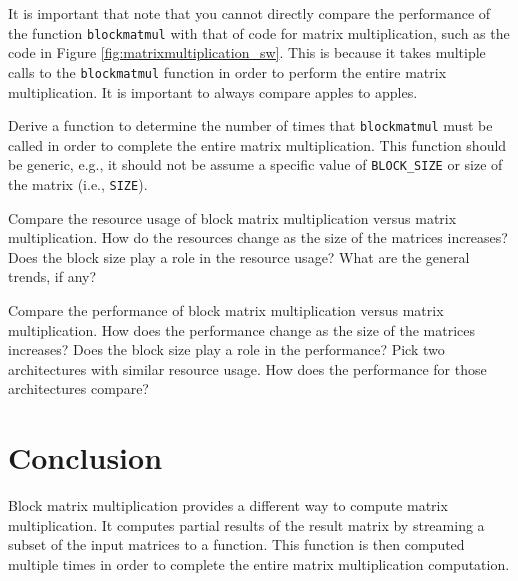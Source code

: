\begin{aside}
It is important that note that you cannot directly compare the performance of the function \lstinline{blockmatmul} with that of code for matrix multiplication, such as the code in Figure \ref{fig:matrixmultiplication_sw}. This is because it takes multiple calls to the \lstinline{blockmatmul} function in order to perform the entire matrix multiplication. It is important to always compare apples to apples.

\begin{exercise}
Derive a function to determine the number of times that \lstinline{blockmatmul} must be called in order to complete the entire matrix multiplication. This function should be generic, e.g., it should not be assume a specific value of \lstinline{BLOCK_SIZE} or size of the matrix (i.e., \lstinline{SIZE}).
\end{exercise}

\begin{exercise}
Compare the resource usage of block matrix multiplication versus matrix multiplication. How do the resources change as the size of the matrices increases? Does the block size play a role in the resource usage? What are the general trends, if any?
\end{exercise}

\begin{exercise}
Compare the performance of block matrix multiplication versus matrix multiplication. How does the performance change as the size of the matrices increases? Does the block size play a role in the performance? Pick two architectures with similar resource usage. How does the performance for those architectures compare?
\end{exercise}

\end{aside}

\section{Conclusion}

Block matrix multiplication provides a different way to compute matrix multiplication. It computes partial results of the result matrix by streaming a subset of the input matrices to a function. This function is then computed multiple times in order to complete the entire matrix multiplication computation. 


